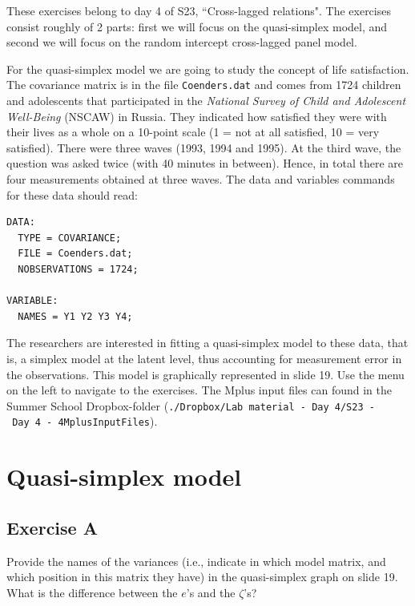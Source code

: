 \documentclass[
]{book}
\begin{document}
These exercises belong to day 4 of S23, ``Cross-lagged relations". The exercises consist roughly of 2 parts: first we will focus on the quasi-simplex model, and second we will focus on the random intercept cross-lagged panel model.

For the quasi-simplex model we are going to study the concept of life satisfaction. The covariance matrix is in the file \texttt{Coenders.dat} and comes from 1724 children and adolescents that participated in the \emph{National Survey of Child and Adolescent Well-Being} (NSCAW) in Russia. They indicated how satisfied they were with their lives as a whole on a 10-point scale (1 = not at all satisfied, 10 = very satisfied). There were three waves (1993, 1994 and 1995). At the third wave, the question was asked twice (with 40 minutes in between). Hence, in total there are four measurements obtained at three waves. The data and variables commands for these data should read:

\begin{verbatim}
DATA: 
  TYPE = COVARIANCE;
  FILE = Coenders.dat;
  NOBSERVATIONS = 1724;

VARIABLE: 
  NAMES = Y1 Y2 Y3 Y4;
\end{verbatim}

The researchers are interested in fitting a quasi-simplex model to these data, that is, a simplex model at the latent level, thus accounting for measurement error in the observations. This model is graphically represented in slide 19. Use the menu on the left to navigate to the exercises. The Mplus input files can found in the Summer School Dropbox-folder (\texttt{./Dropbox/Lab\ material\ -\ Day\ 4/S23\ -\ Day\ 4\ -\ 4MplusInputFiles}).

\hypertarget{quasi-simplex-model}{%
\section{Quasi-simplex model}\label{quasi-simplex-model}}

\hypertarget{exercise-a}{%
\subsection{Exercise A}\label{exercise-a}}

Provide the names of the variances (i.e., indicate in which model matrix, and which position in this matrix they have) in the quasi-simplex graph on slide 19. What is the difference between the \(e\)'s and the \(\zeta\)'s?
\end{document}
